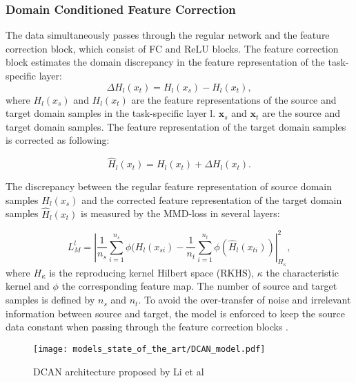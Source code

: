 \subsubsection{Domain Conditioned Feature Correction}
The data simultaneously passes through the regular network and the feature correction block, which consist of FC and ReLU blocks. The feature correction block estimates the domain discrepancy in the feature representation of the task-specific layer:
\begin{equation}
    \Delta H_{l}(x_{t}) = H_{l}(x_{s}) - H_{l}(x_{t}),
\end{equation}
where $H_{l}(x_{s})$ and $H_{l}(x_{t})$ are the feature representations of the source and target domain samples in the task-specific layer l. $\pmb{x}_{s}$ and $\pmb{x}_{t}$ are the source and target domain samples. The feature representation of the target domain samples is corrected as following:

\begin{equation}
    \hat{H}_{l}(x_{t}) = H_{l}(x_{t}) + \Delta H_{l}(x_{t}).
\end{equation}

The discrepancy between the regular feature representation of source domain samples $H_{l}(x_{s})$ and the corrected feature representation of the target domain samples $\hat{H}_{l}(x_{t})$ is measured by the MMD-loss in several layers:

\begin{equation}
    L_{M}^{l} = |\frac{1}{n_s} \sum_{i=1}^{n_{s}} \phi(H_{l}(x_{si}) - \frac{1}{n_t} \sum_{i=1}^{n_{t}} \phi(\hat{H}_{l}(x_{ti}))|_{H_{\kappa}}^{2}, 
\end{equation}
where $H_{\kappa}$ is the reproducing kernel Hilbert space (RKHS), $\kappa$ the characteristic kernel and $\phi$ the corresponding feature map. The number of source and target samples is defined by $n_{s}$ and $n_{t}$. To avoid the over-transfer of noise and irrelevant information between source and target, the model is enforced to keep the source data constant when passing through the feature correction blocks \cite{li2020}.

\begin{figure}[H]
  \centering
  \texttt{[image: models\_state\_of\_the\_art/DCAN\_model.pdf]}
  \caption{DCAN architecture proposed by Li et al \cite{li2020}}
  \label{fig:DCAN_model}
\end{figure}

